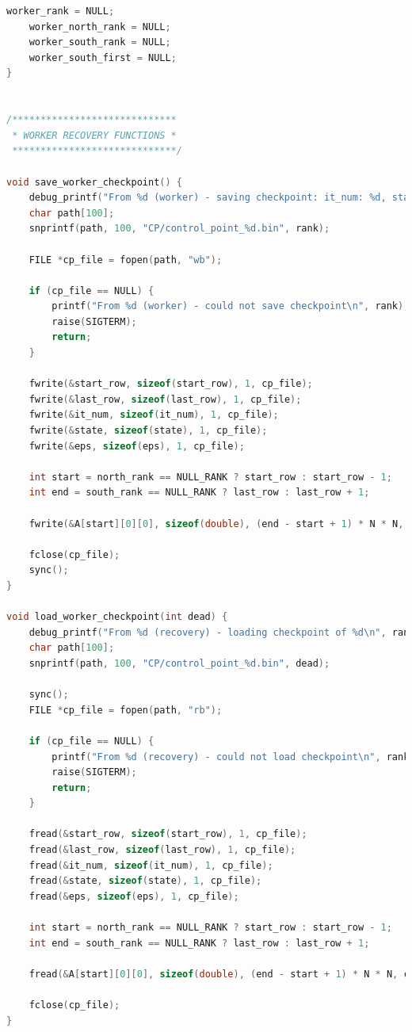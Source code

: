 \documentclass[a4paper]{article}
\begin{document}
\begin{lstlisting}[caption=jac\_3d\_mpi\_ft.c, label={lst:2}, language=C]
    worker_rank = NULL;
    worker_north_rank = NULL;
    worker_south_rank = NULL;
    worker_south_first = NULL;
}


/*****************************
 * WORKER RECOVERY FUNCTIONS *
 *****************************/

void save_worker_checkpoint() {
    debug_printf("From %d (worker) - saving checkpoint: it_num: %d, state: %d\n", rank, it_num, state);
    char path[100];
    snprintf(path, 100, "CP/control_point_%d.bin", rank);

    FILE *cp_file = fopen(path, "wb");

    if (cp_file == NULL) {
        printf("From %d (worker) - could not save checkpoint\n", rank);
        raise(SIGTERM);
        return;
    }

    fwrite(&start_row, sizeof(start_row), 1, cp_file);
    fwrite(&last_row, sizeof(last_row), 1, cp_file);
    fwrite(&it_num, sizeof(it_num), 1, cp_file);
    fwrite(&state, sizeof(state), 1, cp_file);
    fwrite(&eps, sizeof(eps), 1, cp_file);

    int start = north_rank == NULL_RANK ? start_row : start_row - 1;
    int end = south_rank == NULL_RANK ? last_row : last_row + 1;

    fwrite(&A[start][0][0], sizeof(double), (end - start + 1) * N * N, cp_file);

    fclose(cp_file);
    sync();
}

void load_worker_checkpoint(int dead) {
    debug_printf("From %d (recovery) - loading checkpoint of %d\n", rank, dead);
    char path[100];
    snprintf(path, 100, "CP/control_point_%d.bin", dead);

    sync();
    FILE *cp_file = fopen(path, "rb");

    if (cp_file == NULL) {
        printf("From %d (recovery) - could not load checkpoint\n", rank);
        raise(SIGTERM);
        return;
    }

    fread(&start_row, sizeof(start_row), 1, cp_file);
    fread(&last_row, sizeof(last_row), 1, cp_file);
    fread(&it_num, sizeof(it_num), 1, cp_file);
    fread(&state, sizeof(state), 1, cp_file);
    fread(&eps, sizeof(eps), 1, cp_file);

    int start = north_rank == NULL_RANK ? start_row : start_row - 1;
    int end = south_rank == NULL_RANK ? last_row : last_row + 1;

    fread(&A[start][0][0], sizeof(double), (end - start + 1) * N * N, cp_file);

    fclose(cp_file);
}


\end{lstlisting}
\end{document}
